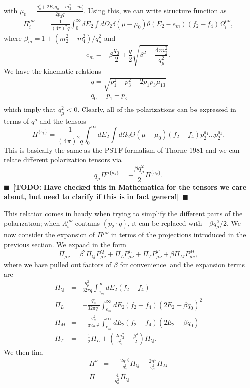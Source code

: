 \documentclass[12pt,letter]{article}
\newcommand{\todo}[1]{{$\blacksquare$~\textbf{\color{blue}[TODO: #1]}}~$\blacksquare$}
\begin{document}
with $\mu_0 = \frac{q_\mu^2 + 2 E_2 q_0 + m_2^2 - m_4^2}{2 p_2 q}$.  Using this, we can write structure function as 
\begin{eqnarray*}
\Pi^{\mu \nu}_{i} &=& \frac{1}{(4 \pi)^2 q} \int_{0}^\infty dE_2 
\int d \Omega_2 \delta(\mu - \mu_0) \theta(E_2-e_{m})
(f_2 - f_4) \Omega_i^{\mu \nu},
\end{eqnarray*} 
where $\beta_m = 1 + (m_2^2 - m_4^2)/q_\mu^2$ and
\begin{equation}
e_{m}=-\beta \frac{q_0}{2} + \frac{q}{2} \sqrt{\beta^2 - \frac{4 m_2^2}{q_\mu^2}}.
\end{equation}  
We have the kinematic relations
\begin{eqnarray*}
q = \sqrt{p_1^2 + p_3^2 - 2 p_1 p_3 \mu_{13}} \\
q_0 = p_1 - p_3 \\ 
\end{eqnarray*}
which imply that $q_\mu^2 < 0$. Clearly, all of the polarizations can be expressed
in terms of $q^\mu$ and the tensors
\begin{equation}
\Pi^{\{a_k\}} = \frac{1}{(4\pi)^2 q} \int_0^\infty dE_2 \int d\Omega_2 
\Theta(\mu-\mu_0) (f_2 - f_4) p_2^{a_1}...p_2^{a_k}.
\end{equation}
This is basically the same as the PSTF formalism of Thorne 1981 and we can relate
different polarization tensors via 
\begin{equation}
q_\mu \Pi^{\mu \{a_k\}} = - \frac{\beta q_\mu^2}{2}\Pi^{ \{a_k\}}.
\end{equation}
\todo{Have checked this in Mathematica for the tensors we care about, but need 
to clarify if this is in fact general}

This relation comes in handy when trying to simplify the different parts of the 
polarization; when $\Lambda^{\mu \nu}_i$ contains $(p_2 \cdot q)$, it can be
replaced with $-\beta q_\mu^2/2$.  We now consider the expansion of $\Pi^{\mu \nu}$ 
in terms of the projections introduced in the previous section. We expand in the 
form 
\begin{equation}
\Pi_{\mu \nu} = \beta^2 \Pi_Q P^Q_{\mu \nu} 
+ \Pi_L P^L_{\mu \nu}
+ \Pi_T P^T_{\mu \nu}
+ \beta \Pi_M P^M_{\mu \nu},  
\end{equation} 
where we have pulled out factors of $\beta$ for convenience, and the expansion
terms are 
\begin{eqnarray}
\Pi_Q &=& \frac{q_\mu^2}{32 \pi q} \int_{e_m}^\infty dE_2(f_2 - f_4) \\
\Pi_L &=&-\frac{q_\mu^2}{32 \pi q^3} \int_{e_m}^\infty dE_2 (f_2 - f_4) 
(2 E_2 + \beta q_0)^2 \\
\Pi_M &=&-\frac{q_\mu^2}{32 \pi q^2} \int_{e_m}^\infty dE_2 (f_2 - f_4) 
(2 E_2 + \beta q_0) \\
\Pi_T &=& - \frac{1}{2}\Pi_L 
+ \left(\frac{2 m_2^2}{q_\alpha^2} - \frac{\beta^2}{2}\right)\Pi_Q.
\end{eqnarray}
We then find 
\begin{eqnarray}
\Pi^\nu &=& -\frac{2 q^\nu \beta }{q_\alpha^2} \Pi_Q 
- \frac{2 n^\nu}{q_\alpha^2} \Pi_M \\
\Pi &=& \frac{4 }{q_\alpha^2} \Pi_Q 
\end{eqnarray}
\end{document}

